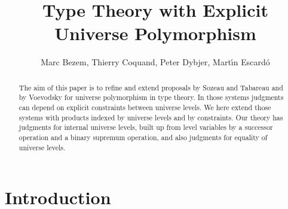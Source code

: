 \documentclass[11pt,a4paper]{article}
\theoremstyle{definition}
\begin{document}
\title{Type Theory with Explicit Universe Polymorphism}

\author{Marc Bezem, Thierry Coquand, Peter Dybjer, Mart\'{\i}n Escard\'o}
\date{}
\maketitle

\begin{abstract}

The aim of this paper is to refine and extend proposals by Sozeau and Tabareau and by Voevodsky for universe polymorphism in type theory. In those systems judgments can depend on explicit constraints between universe levels. We here extend those systems with products indexed by universe levels and by constraints. Our theory has judgments for internal universe levels, built up from level variables by a successor operation and a binary supremum operation, and also judgments for equality of universe levels.


\end{abstract}


\section{Introduction}\label{sec:intro}
\end{document}
